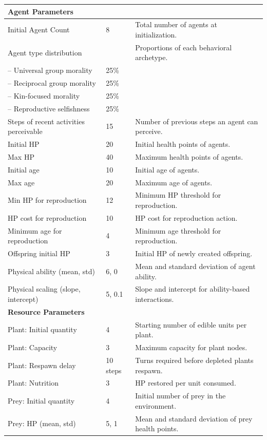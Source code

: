 \begin{table}[htbp]
\begin{tabular}{lp{1.2cm}p{6.5cm}}
\hline
\multicolumn{3}{l}{\textbf{Agent Parameters}} \\
\hline
Initial Agent Count & 8 & Total number of agents at initialization. \\
Agent type distribution &  & Proportions of each behavioral archetype. \\
-- Universal group morality & 25\% &  \\
-- Reciprocal group morality & 25\% &  \\
-- Kin-focused morality & 25\% &  \\
-- Reproductive selfishness & 25\% &  \\
Steps of recent activities perceivable & 15 & Number of previous steps an agent can perceive. \\
Initial HP & 20 & Initial health points of agents. \\
Max HP & 40 & Maximum health points of agents. \\
Initial age & 10 & Initial age of agents. \\
Max age & 20 & Maximum age of agents. \\
Min HP for reproduction & 12 & Minimum HP threshold for reproduction. \\
HP cost for reproduction & 10 & HP cost for reproduction action. \\
Minimum age for reproduction & 4 & Minimum age threshold for reproduction. \\
Offspring initial HP & 3 & Initial HP of newly created offspring. \\
Physical ability (mean, std) & 6, 0 & Mean and standard deviation of agent ability. \\
Physical scaling (slope, intercept) & 5, 0.1 & Slope and intercept for ability-based interactions. \\
\hline
\multicolumn{3}{l}{\textbf{Resource Parameters}} \\
\hline
Plant: Initial quantity & 4 & Starting number of edible units per plant. \\
Plant: Capacity & 3 & Maximum capacity for plant nodes. \\
Plant: Respawn delay & 10 steps & Turns required before depleted plants respawn. \\
Plant: Nutrition & 3 & HP restored per unit consumed. \\
Prey: Initial quantity & 4 & Initial number of prey in the environment. \\
Prey: HP (mean, std) & 5, 1 & Mean and standard deviation of prey health points. \\

\end{tabular}
\end{table}
